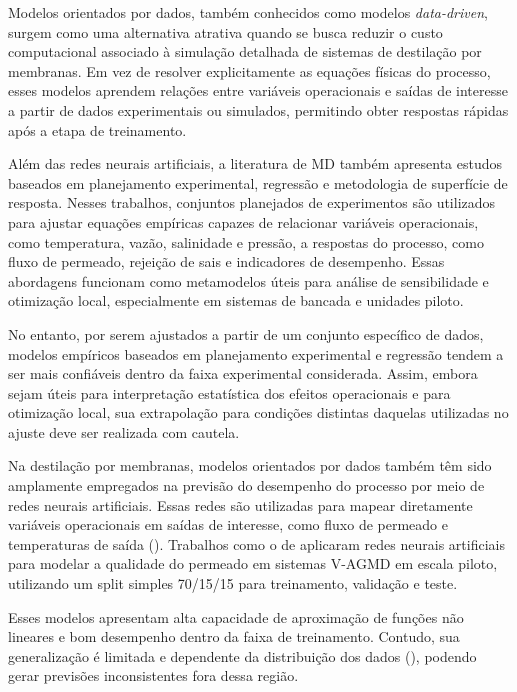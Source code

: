 Modelos orientados por dados, também conhecidos como modelos \textit{data-driven}, surgem como uma alternativa atrativa quando se busca reduzir o custo computacional associado à simulação detalhada de sistemas de destilação por membranas. Em vez de resolver explicitamente as equações físicas do processo, esses modelos aprendem relações entre variáveis operacionais e saídas de interesse a partir de dados experimentais ou simulados, permitindo obter respostas rápidas após a etapa de treinamento.

Além das redes neurais artificiais, a literatura de MD também apresenta estudos baseados em planejamento experimental, regressão e metodologia de superfície de resposta. Nesses trabalhos, conjuntos planejados de experimentos são utilizados para ajustar equações empíricas capazes de relacionar variáveis operacionais, como temperatura, vazão, salinidade e pressão, a respostas do processo, como fluxo de permeado, rejeição de sais e indicadores de desempenho. Essas abordagens funcionam como metamodelos úteis para análise de sensibilidade e otimização local, especialmente em sistemas de bancada e unidades piloto.

No entanto, por serem ajustados a partir de um conjunto específico de dados, modelos empíricos baseados em planejamento experimental e regressão tendem a ser mais confiáveis dentro da faixa experimental considerada. Assim, embora sejam úteis para interpretação estatística dos efeitos operacionais e para otimização local, sua extrapolação para condições distintas daquelas utilizadas no ajuste deve ser realizada com cautela.

Na destilação por membranas, modelos orientados por dados também têm sido amplamente empregados na previsão do desempenho do processo por meio de redes neurais artificiais. Essas redes são utilizadas para mapear diretamente variáveis operacionais em saídas de interesse, como fluxo de permeado e temperaturas de saída (\cite{ReviewAI_MD, ANN_VMD_Fouling}). Trabalhos como o de \cite{Requena2023} aplicaram redes neurais artificiais para modelar a qualidade do permeado em sistemas V-AGMD em escala piloto, utilizando um split simples 70/15/15 para treinamento, validação e teste.

Esses modelos apresentam alta capacidade de aproximação de funções não lineares e bom desempenho dentro da faixa de treinamento. Contudo, sua generalização é limitada e dependente da distribuição dos dados (\cite{ReviewAI_MD}), podendo gerar previsões inconsistentes fora dessa região.

